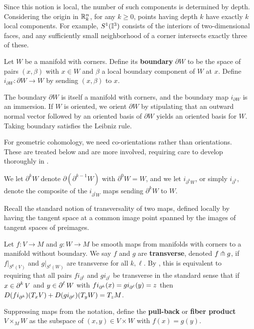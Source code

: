 Since this notion is local, the number of such components is determined by depth.
Considering the origin in $\mathbb{R}^n_k$, for any $k \geq 0$, points having depth $k$ have exactly $k$ local components.
For example, $S^1(\mathbb{I}^3)$ consists of the interiors of two-dimensional faces, and any sufficiently small neighborhood of a corner intersects exactly three of these.

\begin{definition}
	Let $W$ be a manifold with corners. Define its {\bf boundary} $\partial W$ to be the space of pairs $(x, \beta)$ with $x \in W$ and $\beta$ a local boundary component of $W$ at $x$.
	Define $i_{\partial W} \colon \partial W \to W$ by sending $(x,\beta)$ to $x$.
\end{definition}

The boundary $\partial W$ is itself a manifold with corners, and the boundary map $i_{\partial W}$ is an immersion.
If $W$ is oriented, we orient $\partial W$ by stipulating that an outward normal vector followed by an oriented basis of $\partial W$ yields an oriented basis for $W$.
Taking boundary satisfies the Leibniz rule.

For geometric cohomology, we need co-orientations rather than orientations.
These are treated below and are more involved, requiring care to develop thoroughly in \cite[Section 3]{medina2022foundations}.

We let $\partial^k W$ denote $\partial (\partial^{k-1} W)$ with $\partial^0 W = W$, and we let $i_{\partial^k W}$, or simply $i_{\partial^k}$, denote the composite of the $i_{\partial^i W}$ maps sending $\partial^k W$ to $W$.

Recall the standard notion of transversality of two maps, defined locally by having the tangent space at a common image point spanned by the images of tangent spaces of preimages.

\begin{definition}
	Let $f \colon V \to M$ and $g \colon W \to M$ be smooth maps from manifolds with corners to a manifold without boundary.
	We say $f$ and $g$ are \textbf{transverse}, denoted $f \pitchfork g$, if $f|_{S^k(V)}$ and $g|_{S^\ell(W)}$ are transverse for all $k, \ell$.
	By \cite[Lemma 2.15]{medina2022foundations}, this is equivalent to requiring that all pairs $fi_{\partial^k}$ and $gi_{\partial^\ell}$ be transverse in the standard sense that if $x \in \operatorname{\partial}^k V$ and $y\in \operatorname{\partial}^\ell W$ with $fi_{\operatorname{\partial}^k}(x) = g i_{\operatorname{\partial}^\ell} (y) = z$ then $D(fi_{\operatorname{\partial}^k})(T_x V)+D(g i_{\operatorname{\partial}^\ell})(T_y W) = T_z M$.

	Suppressing maps from the notation, define the \textbf{pull-back} or \textbf{fiber product} $V \times_M W$ as the subspace of $(x, y) \in V \times W$ with $f(x) = g(y)$.
\end{definition}

